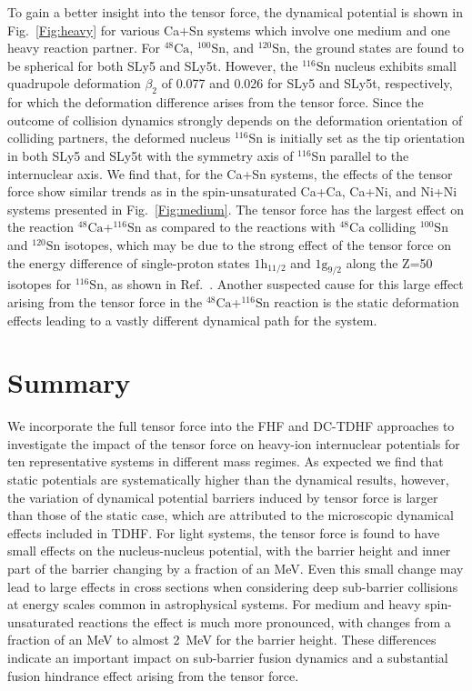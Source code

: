 To gain a better insight into the tensor force, the dynamical potential is shown in Fig.~\ref{Fig:heavy} for various Ca+Sn systems
which involve one medium and
one heavy reaction partner. For $^{48}\mathrm{Ca}$, $^{100}\mathrm{Sn}$, and $^{120}\mathrm{Sn}$, the ground states are found to be spherical for
both SLy5 and SLy5t. However, the $^{116}\mathrm{Sn}$ nucleus exhibits small quadrupole deformation $\beta_2$ of 0.077 and 0.026 for SLy5 and SLy5t, respectively,
for which the deformation difference arises from the tensor force. Since the outcome of collision dynamics strongly depends on the deformation orientation
of colliding partners, the deformed nucleus $^{116}$Sn is initially set as the tip orientation in both SLy5 and SLy5t with the symmetry axis of $^{116}$Sn parallel to the internuclear axis. We find that, for the Ca+Sn systems,
the effects of the tensor force show similar trends as in the spin-unsaturated Ca+Ca, Ca+Ni, and Ni+Ni systems presented in Fig.~\ref{Fig:medium}.
The tensor force has the largest effect on the reaction $^{48}\mathrm{Ca}$+$^{116}\mathrm{Sn}$ as compared to the reactions with $^{48}\mathrm{Ca}$ colliding $^{100}\mathrm{Sn}$ and $^{120}\mathrm{Sn}$
isotopes, which may be due to the strong effect of the tensor force on the energy difference of single-proton states  $1\mathrm{h}_{11/2}$ and $1\mathrm{g}_{9/2}$ along the Z=50 isotopes for $^{116}\mathrm{Sn}$, as shown in Ref.~\citep{Colo2007_PLB646-227}.
Another suspected cause for this large effect arising from the tensor force in the $^{48}\mathrm{Ca}$+$^{116}\mathrm{Sn}$ reaction is the static deformation effects leading to a vastly different dynamical path for the system.


\section{Summary}
We incorporate the full tensor force into the FHF and DC-TDHF approaches to investigate the impact of the tensor force on heavy-ion internuclear potentials for ten representative systems in different mass regimes.
As expected we find that static potentials are systematically higher than the dynamical results, however, the variation of dynamical potential barriers induced by tensor force
is larger than those of the static case, which are attributed to the microscopic dynamical effects included in TDHF.
For light systems, the tensor force is found to have small effects on the nucleus-nucleus potential, with the barrier height and inner part of the barrier changing by a fraction of an MeV. Even this small change may lead to large effects in cross sections when considering deep sub-barrier collisions at energy scales common in astrophysical systems.
For medium and heavy spin-unsaturated reactions the effect is much more pronounced, with changes from a fraction of an MeV to almost 2~MeV for the barrier height. These differences indicate an important impact on sub-barrier fusion dynamics and a substantial fusion hindrance effect arising from the tensor force.

